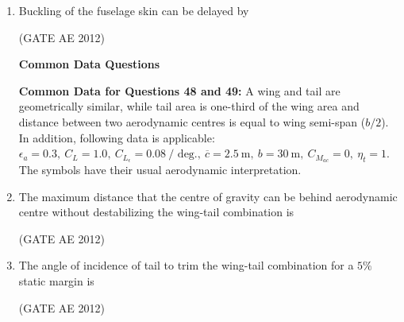 \documentclass[journal,12pt,onecolumn]{IEEEtran}
\theoremstyle{remark}
\begin{document}
\begin{enumerate}
\item Buckling of the fuselage skin can be delayed by 
\begin{enumerate}
\end{enumerate}
\hfill(GATE AE 2012)



\textbf{Common Data Questions}

\textbf{Common Data for Questions 48 and 49:}
A wing and tail are geometrically similar, while tail area is one-third of the wing area and distance between two aerodynamic centres is equal to wing semi-span ($b/2$). In addition, following data is applicable: 
$\epsilon_a = 0.3, \ C_{L} = 1.0, \ C_{L_\epsilon} = 0.08 \ \text{/ deg.}, \ \overline{c} = 2.5 \ \text{m}, \ b = 30 \ \text{m}, \ C_{M_{ac}} = 0, \ \eta_t = 1$. The symbols have their usual aerodynamic interpretation.

\item The maximum distance that the centre of gravity can be behind aerodynamic centre without destabilizing the wing-tail combination is
\begin{enumerate}
\end{enumerate}
\hfill(GATE AE 2012)



\item The angle of incidence of tail to trim the wing-tail combination for a $5\%$ static margin is
\begin{enumerate}
\end{enumerate}
\hfill(GATE AE 2012)




\end{enumerate}
\end{document}

